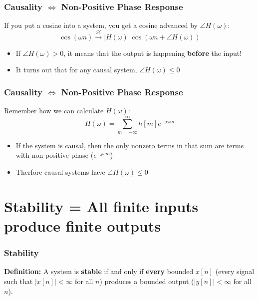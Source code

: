 \documentclass{beamer}
\begin{document}
\begin{frame}
  \frametitle{Causality $\Leftrightarrow$ Non-Positive Phase Response}

  If you put a cosine into a system, you get a cosine advanced by
  $\angle H(\omega)$:
  \begin{displaymath}
    \cos(\omega n) \stackrel{\mathcal H}{\longrightarrow} |H(\omega)|
    \cos\left(\omega n+\angle H(\omega)\right)
  \end{displaymath}
  \begin{itemize}
  \item If $\angle H(\omega)>0$, it means that the output is happening {\bf before} the input!
  \item It turns out that for any causal system, $\angle H(\omega)\le 0$
  \end{itemize}
\end{frame}

\begin{frame}
  \frametitle{Causality $\Leftrightarrow$ Non-Positive Phase Response}

  Remember how we can calculate $H(\omega)$:
  \begin{displaymath}
    H(\omega) = \sum_{m=-\infty}^\infty h[m] e^{-j\omega m}
  \end{displaymath}
  \begin{itemize}
  \item If the system is causal, then the only nonzero terms in that sum are terms with
    non-positive phase ($e^{-j\omega m}$)
  \item Therfore causal systems have $\angle H(\omega)\le 0$
  \end{itemize}
\end{frame}

\section[Stability]{Stability = All finite inputs produce finite outputs}
\setcounter{subsection}{1}

\begin{frame}
  \frametitle{Stability}

  {\bf Definition:} A system is {\bf stable} if and only if {\bf every}
  bounded $x[n]$ (every signal such that $|x[n]|<\infty$ for all $n$) produces a bounded output
  ($|y[n]|<\infty$ for all $n$).
\end{frame}
\end{document}
